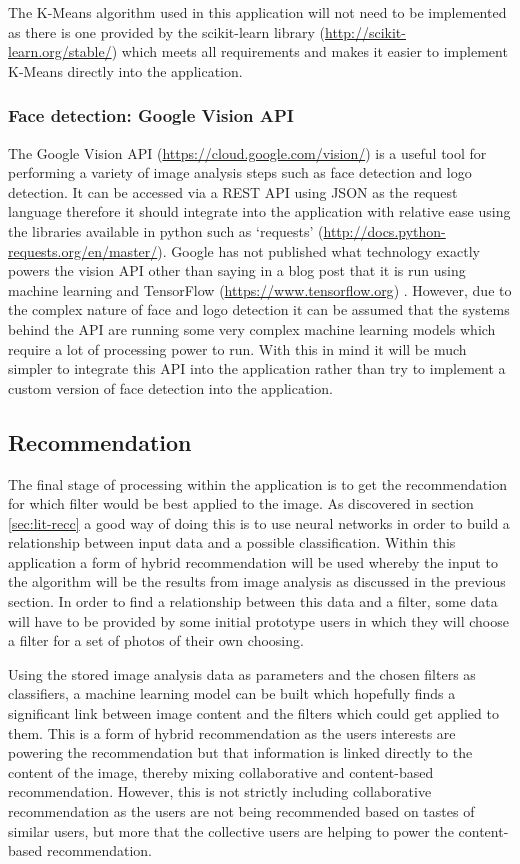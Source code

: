 \documentclass[a4paper,12pt]{report}
\begin{document}
          The K-Means algorithm used in this application will not need to be implemented as there is one provided by the scikit-learn library (\url{http://scikit-learn.org/stable/}) which meets all requirements and makes it easier to implement K-Means directly into the application.

        \subsubsection{Face detection: Google Vision API} \label{sec:visionapi}
          The Google Vision API (\url{https://cloud.google.com/vision/}) is a useful tool for performing a variety of image analysis steps such as face detection and logo detection. It can be accessed via a REST API using JSON as the request language therefore it should integrate into the application with relative ease using the libraries available in python such as ‘requests’ (\url{http://docs.python-requests.org/en/master/}). Google has not published what technology exactly powers the vision API other than saying in a blog post that it is run using machine learning and TensorFlow (\url{https://www.tensorflow.org}) \citep{vision2015blog}. However, due to the complex nature of face and logo detection it can be assumed that the systems behind the API are running some very complex machine learning models which require a lot of processing power to run. With this in mind it will be much simpler to integrate this API into the application rather than try to implement a custom version of face detection into the application.

      \subsection{Recommendation}
        The final stage of processing within the application is to get the recommendation for which filter would be best applied to the image.
        As discovered in section \ref{sec:lit-recc} a good way of doing this is to use neural networks in order to build a relationship between input data and a possible classification. Within this application a form of hybrid recommendation will be used whereby the input to the algorithm will be the results from image analysis as discussed in the previous section. In order to find a relationship between this data and a filter, some data will have to be provided by some initial prototype users in which they will choose a filter for a set of photos of their own choosing.

        Using the stored image analysis data as parameters and the chosen filters as classifiers, a machine learning model can be built which hopefully finds a significant link between image content and the filters which could get applied to them. This is a form of hybrid recommendation as the users interests are powering the recommendation but that information is linked directly to the content of the image, thereby mixing collaborative and content-based recommendation. However, this is not strictly including collaborative recommendation as the users are not being recommended based on tastes of similar users, but more that the collective users are helping to power the content-based recommendation.
\end{document}
